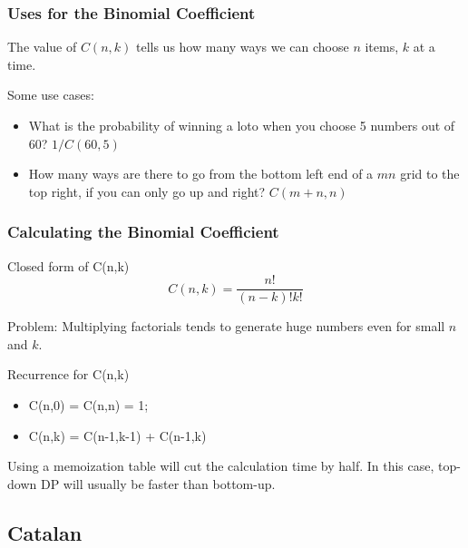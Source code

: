 \documentclass{beamer}
\begin{document}
\begin{frame}
  \frametitle{Uses for the Binomial Coefficient}

  The value of $C(n,k)$ tells us how many ways we can choose $n$
  items, $k$ at a time.

  \bigskip

  Some use cases:
  \begin{itemize}
  \item {} What is the probability of winning
    a loto when you choose 5 numbers out of 60? $1/C(60,5)$
  \item {} How many ways are there to go from the
    bottom left end of a $mn$ grid to the top right, if you can only
    go up and right? $C(m+n,n)$
  \end{itemize}
\end{frame}


\begin{frame}
  \frametitle{Calculating the Binomial Coefficient}
  {\smaller

    \begin{block}{Closed form of C(n,k)}
      \begin{equation*}
        C(n,k) = \frac{n!}{(n-k)!k!}
      \end{equation*}

      \alert{Problem}: Multiplying factorials tends to generate huge numbers
      even for small $n$ and $k$.
    \end{block}

    \begin{block}{Recurrence for C(n,k)}
      \begin{itemize}
      \item C(n,0) = C(n,n) = 1;
      \item C(n,k) = C(n-1,k-1) + C(n-1,k)
      \end{itemize}

      Using a memoization table will cut the calculation time by
      half. In this case, top-down DP will usually be faster than
      bottom-up.
    \end{block}
  }
\end{frame}

\subsection{Catalan}
\end{document}
